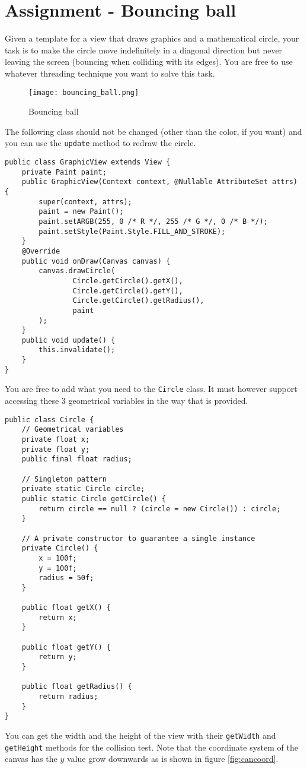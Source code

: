 \section{Assignment - Bouncing ball}
Given a template for a view that draws graphics and a mathematical circle, your task is to make the circle move indefinitely in a diagonal direction but never leaving the screen (bouncing when colliding with its edges). You are free to use whatever threading technique you want to solve this task.

\begin{figure}[H]
\centering
\texttt{[image: bouncing\_ball.png]}
\caption{Bouncing ball}
\label{fig:bball}
\end{figure}

The following class should not be changed (other than the color, if you want) and you can use the \texttt{update} method to redraw the circle.
\begin{lstlisting}[style=A_Java]
public class GraphicView extends View {
    private Paint paint;
    public GraphicView(Context context, @Nullable AttributeSet attrs) {
        super(context, attrs);
        paint = new Paint();
        paint.setARGB(255, 0 /* R */, 255 /* G */, 0 /* B */);
        paint.setStyle(Paint.Style.FILL_AND_STROKE);
    }
    @Override
    public void onDraw(Canvas canvas) {
        canvas.drawCircle(
                Circle.getCircle().getX(), 
                Circle.getCircle().getY(),
                Circle.getCircle().getRadius(), 
                paint
        );
    }
    public void update() {
        this.invalidate();
    }
}
\end{lstlisting}
You are free to add what you need to the \texttt{Circle} class. It must however support accessing these 3 geometrical variables in the way that is provided.
\begin{lstlisting}[style=A_Java]
public class Circle {
    // Geometrical variables
    private float x;
    private float y;
    public final float radius;

    // Singleton pattern
    private static Circle circle;
    public static Circle getCircle() {
        return circle == null ? (circle = new Circle()) : circle;
    }

    // A private constructor to guarantee a single instance
    private Circle() {
        x = 100f;
        y = 100f;
        radius = 50f;
    }

    public float getX() {
        return x;
    }

    public float getY() {
        return y;
    }

    public float getRadius() {
        return radius;
    }
}
\end{lstlisting}
You can get the width and the height of the view with their \texttt{getWidth} and \texttt{getHeight} methods for the collision test. Note that the coordinate system of the canvas has the $y$ value grow downwards as is shown in figure \ref{fig:cancoord}.

